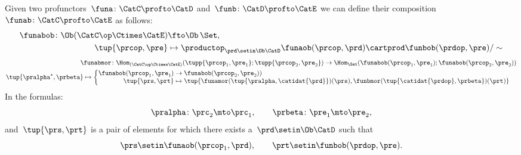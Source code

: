 \begin{widepar}
    \begin{ctdefinition}
        \label{def:profunctor-composition}
        Given two profunctors~$\funa\colon \CatC \profto \CatD$ and~$\funb\colon \CatD \profto \CatE$
        we can define their composition~$\funab\colon \CatC \profto \CatE$ as follows:
        \begin{equation}
            \begin{aligned}
                \funabob \colon \Ob(\CatC\op \Ctimes \CatE) & \fto  \Ob\, \Set, \\
                \tup{\prcop, \pre}                          & \mapsto \productop_{\prd\setin\Ob \CatD} \funaob(\prcop, \prd) \cartprod \funbob(\prdop, \pre) / \sim
            \end{aligned}
        \end{equation}
        \begin{equation}
            \begin{aligned}
                \funabmor  \colon \Hom_{(\CatC\op \Ctimes \CatE)}( \tupp{\prcop_1, \pre_1}; \tupp{\prcop_2, \pre_2}) \to \Hom_{\Set}( \funabob(\prcop_1, \pre_1); \funabob(\prcop_2, \pre_2)) \\
                \tup{\pralpha^\ast, \prbeta} \mapsto  \begin{cases}
                                                          \begin{aligned}
                        \funabob(\prcop_1, \pre_1) & \to   \funabob(\prcop_2, \pre_2)) \\
                        \tup{\prs, \prt}           & \mapsto  \tup{
                            \funamor(\tup{\pralpha, \catidat{\prd}})(\prs),
                            \funbmor(\tup{\catidat{\prdop}, \prbeta})(\prt)}
                    \end{aligned}
                                                      \end{cases}
            \end{aligned}
        \end{equation}
        In the formulas:
        \begin{equation}
            \pralpha\colon \prc_2 \mto \prc_1, \qquad
            \prbeta\colon \pre_1 \mto \pre_2,
        \end{equation}
        and~$\tup{\prs, \prt}$ is a pair of elements for which there exists a~$\prd\setin\Ob \CatD$ such that
        \begin{equation}
            \prs \setin \funaob(\prcop_1, \prd), \qquad\prt \setin \funbob(\prdop, \pre).
        \end{equation}
    \end{ctdefinition}
\end{widepar}

